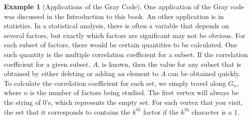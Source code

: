 \documentclass[10pt,]{book}
\theoremstyle{plain}
\theoremstyle{definition}
\theoremstyle{definition}
\theoremstyle{definition}
\newtheorem{example}[theorem]{Example}
\theoremstyle{definition}
\theoremstyle{definition}
\numberwithin{equation}{section}
\begin{document}
\begin{example}[Applications of the Gray Code]\label{example-16}
 One application of the Gray code was discussed in the Introduction to this book.  An other application is
in statistics. In a statistical analysis, there is often a variable that depends on several factors, but exactly which factors are significant
may not be obvious. For each subset of factors, there would be certain quantities to be calculated. One such quantity is the multiple correlation
coefficient for a subset. If the correlation coefficient for a given subset, \(A\), is known, then the value for any subset that is obtained
by either deleting or adding an element to \(A\) can be obtained quickly. To calculate the correlation coefficient for each set, we simply
travel along \(G_n\), where \(n\) is the number of factors being studied. The first vertex will always be the string of 0's, which represents
the empty set. For each vertex that you visit, the set that it corresponds to contains the \(k^{\text{th}}\) factor if the \(k^{\text{th}}\) character
is a 1.%
\end{example}
\typeout{************************************************}
\typeout{************************************************}
\end{document}
